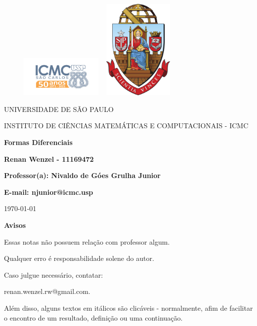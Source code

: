\documentclass[12pt]{article}
\theoremstyle{definition}
\begin{document}
\begin{figure}[ht]
	\includegraphics[width=4cm]{../icmc.png}
	\hspace{7cm}
	\includegraphics[height=4.9cm,width=4cm]{../brasao_usp_cor.jpg}
	\endminipage
\end{figure}

\begin{center}
	\vspace{1cm}
	\LARGE
	UNIVERSIDADE DE SÃO PAULO

	\vspace{1.3cm}
	\LARGE
	INSTITUTO DE CIÊNCIAS MATEMÁTICAS E COMPUTACIONAIS - ICMC

	\vspace{1.7cm}
	\Large
	\textbf{Formas Diferenciais}

	\vspace{1.3cm}
	\large
	\textbf{Renan Wenzel - 11169472}

	\vspace{1.3cm}
	\large
	\textbf{Professor(a): Nivaldo de Góes Grulha Junior}

	\textbf{E-mail: njunior@icmc.usp}

	\vspace{1.3cm}
	\today
\end{center}

\newpage
\textbf{{\Huge Avisos}}

{\huge Essas notas não possuem relação com professor algum.

	Qualquer erro é responsabilidade solene do autor.

	Caso julgue necessário, contatar:

	renan.wenzel.rw@gmail.com.

	Além disso, alguns textos em itálicos são clicáveis - normalmente, afim de facilitar o encontro de um resultado, definição ou uma continuação.
}
\end{document}
